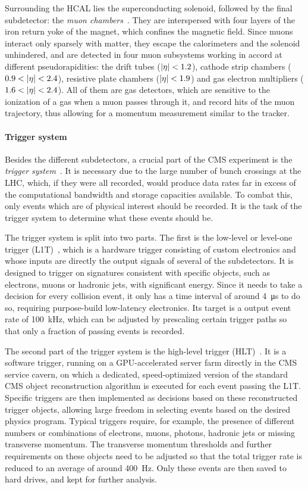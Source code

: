 Surrounding the HCAL lies the superconducting solenoid, followed by the final subdetector: the \textit{muon chambers}~\cite{CMS:1997iti,Pozzobon:2701333}. They are interspersed with four layers of the iron return yoke of the magnet, which confines the magnetic field. Since muons interact only sparsely with matter, they escape the calorimeters and the solenoid unhindered, and are detected in four muon subsystems working in accord at different pseudorapidities: the drift tubes ($|\eta| < 1.2$), cathode strip chambers ($0.9 < |\eta| < 2.4$), resistive plate chambers ($|\eta| < 1.9$) and gas electron multipliers ($1.6 < |\eta| < 2.4$). All of them are gas detectors, which are sensitive to the ionization of a gas when a muon passes through it, and record hits of the muon trajectory, thus allowing for a momentum measurement similar to the tracker.

\paragraph{Trigger system}
Besides the different subdetectors, a crucial part of the CMS experiment is the \textit{trigger system}~\cite{CMS-TRG-12-001}. It is necessary due to the large number of bunch crossings at the LHC, which, if they were all recorded, would produce data rates far in excess of the computational bandwidth and storage capacities available. To combat this, only events which are of physical interest should be recorded. It is the task of the trigger system to determine what these events should be.

The trigger system is split into two parts. The first is the low-level or level-one trigger (L1T)~\cite{CMS:TRG-17-001}, which is a hardware trigger consisting of custom electronics and whose inputs are directly the output signals of several of the subdetectors. It is designed to trigger on signatures consistent with specific objects, such as electrons, muons or hadronic jets, with significant energy. Since it needs to take a decision for every collision event, it only has a time interval of around \SI{4}{\micro\second} to do so, requiring purpose-build low-latency electronics. Its target is a output event rate of 100~kHz, which can be adjusted by prescaling certain trigger paths so that only a fraction of passing events is recorded.

The second part of the trigger system is the high-level trigger (HLT)~\cite{CMSTrigger:2005yhe,Varghese:20232Q}. It is a software trigger, running on a GPU-accelerated server farm directly in the CMS service cavern, on which a dedicated, speed-optimized version of the standard CMS object reconstruction algorithm is executed for each event passing the L1T. Specific triggers are then implemented as decisions based on these reconstructed trigger objects, allowing large freedom in selecting events based on the desired physics program. Typical triggers require, for example, the presence of different numbers or combinations of electrons, muons, photons, hadronic jets or missing transverse momentum. The transverse momentum thresholds and further requirements on these objects need to be adjusted so that the total trigger rate is reduced to an average of around 400~Hz. Only these events are then saved to hard drives, and kept for further analysis.

